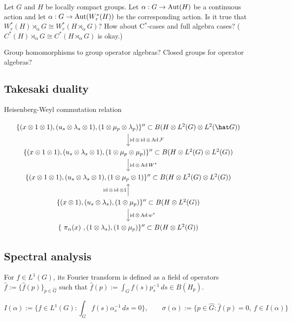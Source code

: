 \documentclass{../../../small}
\begin{document}
\begin{ex}
Let $G$ and $H$ be locally compact groups.
Let $\alpha:G\to\operatorname{Aut}(H)$ be a continuous action and let $\alpha:G\to\operatorname{Aut}(W^*_r(H))$ be the corresponding action.
Is it true that $W^*_r(H)\rtimes_\alpha G\cong W^*_r(H\rtimes_\alpha G)$?
How about C$^*$-cases and full algebra cases?
($C^*(H)\rtimes_\alpha G\cong C^*(H\rtimes_\alpha G)$ is okay.)

Group homomorphisms to group operator algebras?
Closed groups for operator algebras?
\end{ex}




\subsection{Takesaki duality}


Heisenberg-Weyl commutation relation

\[\begin{tikzcd}
\{(x\otimes1\otimes1),(u_s\otimes\lambda_s\otimes1),(1\otimes\mu_p\otimes\lambda_p)\}''\subset B(H\otimes L^2(G)\otimes L^2(\hat G)) \dar{\id\otimes\id\otimes\Ad\cF}\\
\{(x\otimes1\otimes1),(u_s\otimes\lambda_s\otimes1),(1\otimes\mu_p\otimes\mu_p)\}''\subset B(H\otimes L^2(G)\otimes L^2(G)) \dar{\id\otimes\Ad W^*}\\
\{(x\otimes1\otimes1),(u_s\otimes\lambda_s\otimes1),(1\otimes\mu_p\otimes1)\}''\subset B(H\otimes L^2(G)\otimes L^2(G))\\
\{(x\otimes1),(u_s\otimes\lambda_s),(1\otimes\mu_p)\}''\subset B(H\otimes L^2(G)) \dar{\id\otimes\Ad w^*}\uar{\id\otimes\id\otimes1}\\
\{\ \pi_\alpha(x)\ ,(1\otimes\lambda_s),(1\otimes\mu_p)\}''\subset B(H\otimes L^2(G))
\end{tikzcd}\]




\subsection{Spectral analysis}

For $f\in L^1(G)$, its Fourier transform is defined as a field of operators $\hat f:=\{\hat f(p)\}_{p\in\hat G}$ such that $\hat f(p):=\int_Gf(s)p_s^{-1}\,ds\in B(H_p)$.



\[I(\alpha):=\{f\in L^1(G):\int_Gf(s)\alpha_s^{-1}\,ds=0\},\qquad\sigma(\alpha):=\{p\in\hat G:\hat f(p)=0,\ f\in I(\alpha)\}\]
\end{document}
